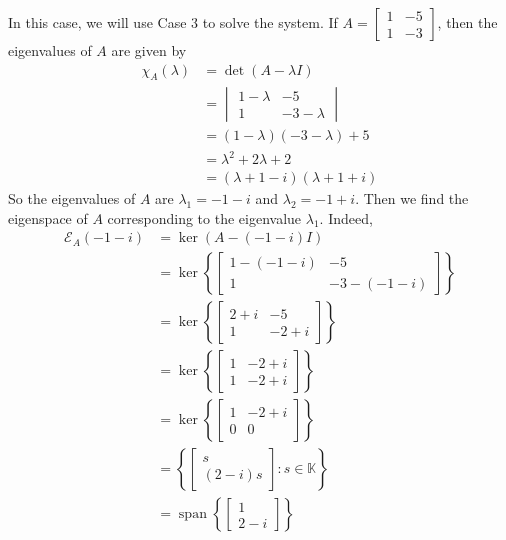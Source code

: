 \documentclass[11pt]{book}
\theoremstyle{definition}\newtheorem{definition}[subsection]{Definition}
\theoremstyle{definition}\newtheorem{example}[subsection]{Example}
\theoremstyle{definition}\newtheorem{notation}[subsection]{Notation}
\theoremstyle{definition}\newtheorem{remark}[subsection]{Remark}
\theoremstyle{theorem}\newtheorem{theorem}[subsection]{Theorem}
\theoremstyle{theorem}\newtheorem{lemma}[subsection]{Lemma}
\theoremstyle{theorem}\newtheorem{proposition}[subsection]{Proposition}
\theoremstyle{theorem}\newtheorem{corollary}[subsection]{Corollary}
\theoremstyle{theorem}\newtheorem{case}{Case}
\theoremstyle{remark}\newtheorem{subcase}{Subcase}[case]
\newcommand{\K}{\mathbb{K}}
\newcommand{\E}{\mathcal{E}}
\DeclareMathOperator{\Span}{span}
\begin{document}
In this case, we will use Case 3 to solve the system. If $A = \begin{bmatrix} 1 & -5 \\ 1 & -3 \end{bmatrix}$, then the eigenvalues of $A$ are given by
\begin{align*}
    \chi_A(\lambda) &= \det(A - \lambda I) \\
    &= \begin{vmatrix} 1 - \lambda & -5 \\ 1 & -3 - \lambda \end{vmatrix} \\
    &= (1 - \lambda)(-3 - \lambda) + 5 \\
    &= \lambda^2 + 2\lambda + 2 \\
    &= (\lambda + 1 - i)(\lambda + 1 + i)
\end{align*}
So the eigenvalues of $A$ are $\lambda_1 = -1 - i$ and $\lambda_2 = -1 + i$. Then we find the eigenspace of $A$ corresponding to the eigenvalue $\lambda_1$. Indeed,
\begin{align*}
    \E_A(-1 - i) &= \ker(A - (-1 - i)I) \\
    &= \ker\left\{\begin{bmatrix} 1 - (-1 - i) & -5 \\ 1 & -3 - (-1 - i)\end{bmatrix}\right\} \\
    &= \ker\left\{\begin{bmatrix} 2 + i & -5 \\ 1 & -2 + i \end{bmatrix}\right\} \\
    &= \ker\left\{\begin{bmatrix} 1 & -2 + i \\ 1 & -2 + i \end{bmatrix}\right\} \\
    &= \ker\left\{\begin{bmatrix} 1 & -2 + i \\ 0 & 0 \end{bmatrix}\right\} \\
    &= \left\{\begin{bmatrix} s \\ (2 - i)s \end{bmatrix} : s \in \K\right\} \\
    &= \Span\left\{\begin{bmatrix} 1 \\ 2 - i \end{bmatrix}\right\}
\end{align*}
\end{document}
